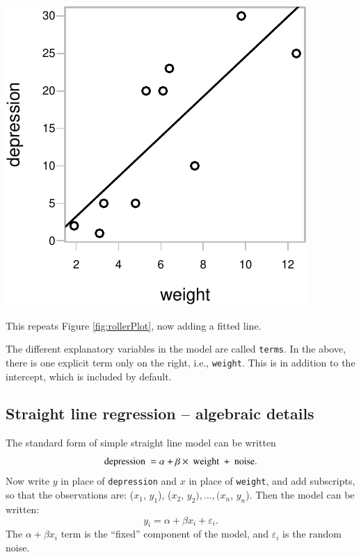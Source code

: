 \documentclass{tufte-book}\usepackage[]{graphicx}\usepackage[]{color}
\begin{document}
\begin{marginfigure}
\begin{Schunk}


\centerline{\includegraphics[width=\textwidth]{figs/8-pltWline-1} }

\end{Schunk}
\caption{This repeats Figure \ref{fig:rollerPlot}, now adding a fitted
  line.}\label{fig:rollerPlot-withline}
\end{marginfigure}

The different explanatory variables in the model are called
\texttt{terms}.  In the above, there is one explicit term only on the
right, i.e., \texttt{weight}. This is in addition to the intercept,
which is included by default.

\subsection{Straight line regression -- algebraic details}\label{ss:briefls}
The standard form of simple straight line model can be written\vspace*{-1pt}
\[ \mbox{depression } = \alpha + \beta \times \mbox{ weight } + \mbox{ noise}.
\vspace*{-4pt}
\]
Now write $y$ in place of \texttt{depression} and $x$ in place of
\texttt{weight}, and add subscripts, so that the observations are:
($x_{1}$, $y_{1}$), ($x_{2}$, $y_{2}),\ldots{,} (x_{n}$, $y_{n}$).  Then
the model can be written:
 \[ y_{i} = \alpha + \beta x_{i} + \varepsilon_{i}.\]
The $\alpha +
\beta x_{i}$ term is the ``fixed'' component of the model, and
$\varepsilon_{i}$ is the random noise.
\end{document}
